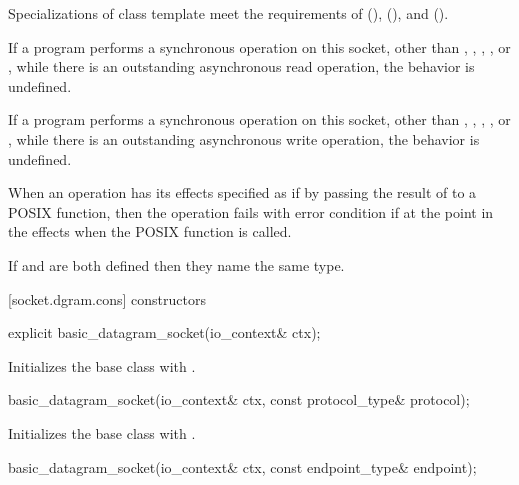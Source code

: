 \pnum
Specializations of class template  meet the requirements of  (),  (), and  ().

\pnum
If a program performs a synchronous operation on this socket, other than , , , , or , while there is an outstanding asynchronous read operation, the behavior is undefined.

\pnum
If a program performs a synchronous operation on this socket, other than , , , , or , while there is an outstanding asynchronous write operation, the behavior is undefined.

\pnum
When an operation has its effects specified as if by passing the result of  to a POSIX function, then the operation fails with error condition  if  at the point in the effects when the POSIX function is called.

\pnum
If  and 
are both defined then they name the same type.

[socket.dgram.cons]{ constructors}

\begin{itemdecl}
explicit basic_datagram_socket(io_context& ctx);
\end{itemdecl}

\begin{itemdescr}
\pnum
\effects Initializes the base class with .
\end{itemdescr}

\begin{itemdecl}
basic_datagram_socket(io_context& ctx, const protocol_type& protocol);
\end{itemdecl}

\begin{itemdescr}
\pnum
\effects Initializes the base class with .
\end{itemdescr}

\begin{itemdecl}
basic_datagram_socket(io_context& ctx, const endpoint_type& endpoint);
\end{itemdecl}

